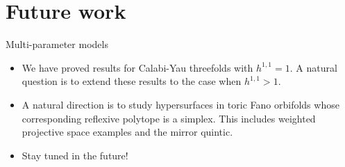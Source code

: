 \documentclass[10pt]{beamer}
\newcommand{\1}{\mathbf{1}}
\newcommand{\2}{\mathbf{2}}
\newcommand{\3}{\mathbf{3}}
\theoremstyle{definition}
\theoremstyle{remark}
\theoremstyle{plain}
\theoremstyle{definition}
\theoremstyle{remark}
\begin{document}
\section{Future work}%
\label{sec:Speculation}

\begin{frame}{Multi-parameter models}
  \begin{itemize}[<+->]
    \item We have proved results for Calabi-Yau threefolds with $h^{1,1} = 1$. A natural question is to extend these results to the case when $h^{1,1} > 1$.
    \item A natural direction is to study hypersurfaces in toric Fano orbifolds whose corresponding reflexive polytope is a simplex. This includes weighted projective space examples and the mirror quintic.
    \item Stay tuned in the future!
  \end{itemize}
\end{frame}
\end{document}
